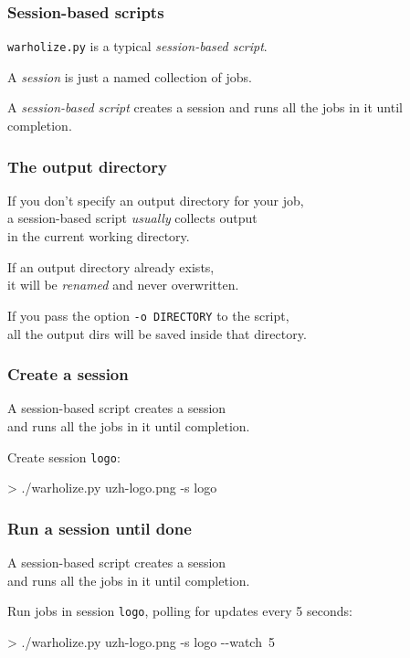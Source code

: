 \documentclass[english,serif,mathserif,usenames,dvipsnames]{beamer}
\begin{document}
\begin{frame}
  \frametitle{Session-based scripts}

  \texttt{warholize.py} is a typical \emph{session-based script}.

  \+ A \emph{session} is just a named collection of jobs.

  \+ A \emph{session-based script} creates a session and runs all the
  jobs in it until completion.
\end{frame}


\begin{frame}
  \frametitle{The output directory}
  \begin{center}
    If you don't specify an output directory for your job, \\ a session-based
    script \emph{usually} collects output \\ in the current working directory.

    \+ If an output directory already exists, \\ it will be
    \textit{renamed} and never overwritten.

    \+ If you pass the option \lstinline|-o DIRECTORY| to the script, \\
    all the output dirs will be saved inside that directory.
  \end{center}
\end{frame}


\begin{frame}
  \frametitle{Create a session}

  A session-based script \alert{creates a session}
  \\
  and runs all the jobs in it until completion.

  \+ Create session \texttt{logo}:
\begin{semiverbatim}
    > ./warholize.py uzh-logo.png -s logo
\end{semiverbatim}
\end{frame}


\begin{frame}
  \frametitle{Run a session until done}

  A session-based script creates a session
  \\
  and \alert{runs all the jobs in it until completion.}

  \+ Run jobs in session \texttt{logo},
  polling for updates every 5 seconds:
\begin{semiverbatim}\small
    > ./warholize.py uzh-logo.png -s logo -{}-watch~5
\end{semiverbatim}

  \+ 
\end{frame}
\end{document}
